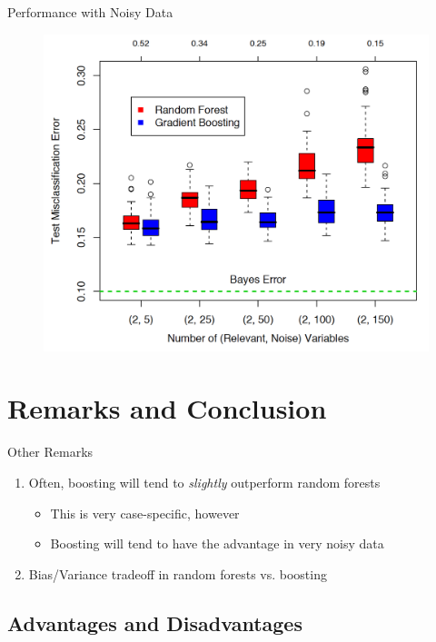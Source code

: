 \documentclass[pdf]{beamer}
\begin{document}
		
		\begin{frame}{Performance with Noisy Data}
			\begin{figure}
				\includegraphics[scale = 0.22]{test_error.png}
			\end{figure}		
    		\end{frame}
		
\section{Remarks and Conclusion}	
				
		\begin{frame}{Other Remarks}
			\begin{enumerate}
				
				\item Often, boosting will tend to \textit{slightly} outperform random forests
					\begin{itemize}
						\item This is very case-specific, however
						\item Boosting will tend to have the advantage in very noisy data
					\end{itemize}
				\item Bias/Variance tradeoff in random forests vs. boosting
				
				
			\end{enumerate}
		\end{frame}
	
	
	\subsection{Advantages and Disadvantages}
		
\end{document}
